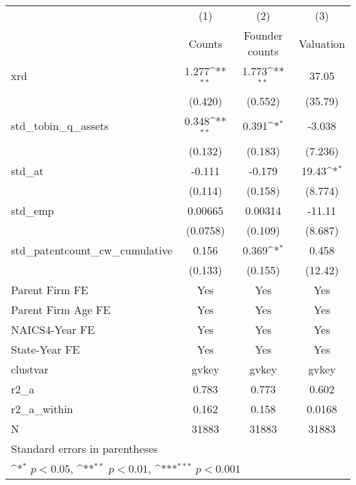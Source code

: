 {
\def\sym#1{\ifmmode^{#1}\else\(^{#1}\)\fi}
\begin{tabular}{l*{3}{c}}
\hline\hline
            &\multicolumn{1}{c}{(1)}&\multicolumn{1}{c}{(2)}&\multicolumn{1}{c}{(3)}\\
            &\multicolumn{1}{c}{Counts}&\multicolumn{1}{c}{Founder counts}&\multicolumn{1}{c}{Valuation}\\
\hline
xrd         &       1.277\sym{**} &       1.773\sym{**} &       37.05         \\
            &     (0.420)         &     (0.552)         &     (35.79)         \\
[1em]
std\_tobin\_q\_assets&       0.348\sym{**} &       0.391\sym{*}  &      -3.038         \\
            &     (0.132)         &     (0.183)         &     (7.236)         \\
[1em]
std\_at      &      -0.111         &      -0.179         &       19.43\sym{*}  \\
            &     (0.114)         &     (0.158)         &     (8.774)         \\
[1em]
std\_emp     &     0.00665         &     0.00314         &      -11.11         \\
            &    (0.0758)         &     (0.109)         &     (8.687)         \\
[1em]
std\_patentcount\_cw\_cumulative&       0.156         &       0.369\sym{*}  &       0.458         \\
            &     (0.133)         &     (0.155)         &     (12.42)         \\
[1em]
Parent Firm FE&         Yes         &         Yes         &         Yes         \\
[1em]
Parent Firm Age FE&         Yes         &         Yes         &         Yes         \\
[1em]
NAICS4-Year FE&         Yes         &         Yes         &         Yes         \\
[1em]
State-Year FE&         Yes         &         Yes         &         Yes         \\
\hline
clustvar    &       gvkey         &       gvkey         &       gvkey         \\
r2\_a        &       0.783         &       0.773         &       0.602         \\
r2\_a\_within &       0.162         &       0.158         &      0.0168         \\
N           &       31883         &       31883         &       31883         \\
\hline\hline
\multicolumn{4}{l}{\footnotesize Standard errors in parentheses}\\
\multicolumn{4}{l}{\footnotesize \sym{*} \(p<0.05\), \sym{**} \(p<0.01\), \sym{***} \(p<0.001\)}\\
\end{tabular}
}
